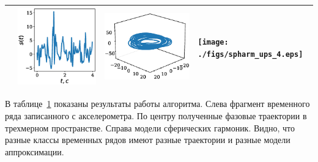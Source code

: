 \documentclass[article,14pt,subf,href,colorlinks=true
]{disser}
\begin{document}
\begin{table}[H]
\begin{tabular}{p{1.1cm}p{3.3cm}p{4.6cm}p{4cm}}
    & \includegraphics[scale=0.31]{./figs/time_series_ups_4.eps}
    & \includegraphics[scale=0.36]{./figs/phase_traj_ups_4.eps}
    & \texttt{[image: ./figs/spharm\_ups\_4.eps]}
    \\ 
    \hline
\end{tabular}
\label{tbl:table_of_figures}
\end{table}

В таблице~\ref{tbl:table_of_figures} показаны результаты работы алгоритма.
Слева фрагмент временного ряда записанного с акселерометра.
По центру полученные фазовые траектории в трехмерном пространстве.
Справа модели сферических гармоник.
Видно, что разные классы временных рядов имеют разные траектории и разные модели аппроксимации.
\end{document}
